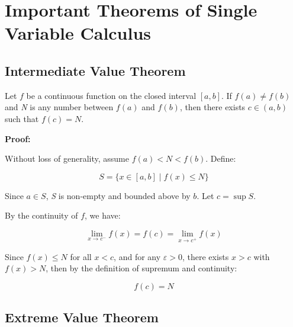 \newpage
\section{Important Theorems of Single Variable Calculus}

\subsection{Intermediate Value Theorem}

Let \(f\) be a continuous function on the closed interval \([a, b]\). If \( f(a) \ne f(b) \) 
and \emph{N} is any number between \( f(a) \) and \( f(b) \), then there exists \( c \in (a, b) \) 
such that \( f(c) = N \).

\textbf{Proof:}  

Without loss of generality, assume \( f(a) < N < f(b) \).  
Define:

\[
    S = \{ x \in [a, b] \mid f(x) \le N \}
\]

Since \( a \in S \), \emph{S} is non-empty and bounded above by \(b\). Let \( c = \sup S \).

By the continuity of \(f\), we have:

\[
    \lim_{x \to c^-} f(x) = f(c) = \lim_{x \to c^+} f(x)
\]

Since \( f(x) \le N \) for all \( x < c \), and for any \( \varepsilon > 0 \), 
there exists \( x > c \) with \( f(x) > N \), then by the definition of supremum and continuity:

\[
    f(c) = N
\]

\QED

\begin{center}
\end{center}

\subsection{Extreme Value Theorem}

